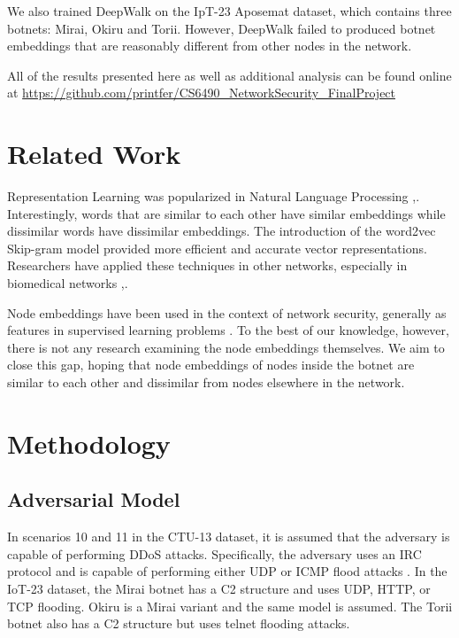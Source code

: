 \documentclass[10pt]{article}
\begin{document}
\begin{multicols}{2}
We also trained DeepWalk on the IpT-23 Aposemat \cite{IoT-23} dataset, which contains three botnets: Mirai, Okiru and Torii. However, DeepWalk failed to produced botnet embeddings that are reasonably different from other nodes in the network.

All of the results presented here as well as additional analysis can be found online at \url{https://github.com/printfer/CS6490_NetworkSecurity_FinalProject}

\section{Related Work}

Representation Learning was popularized in Natural Language Processing \cite{Camacho},\cite{Madelbaum}. Interestingly, words that are similar to each other have similar embeddings while dissimilar words have dissimilar embeddings. The introduction of the word2vec Skip-gram model \cite{Mikolov} provided more efficient and accurate vector representations.  Researchers have applied these techniques in other networks, especially in biomedical networks \cite{Perkins},\cite{Yue}.

Node embeddings have been used in the context of network security, generally as features in supervised learning problems \cite{Skorniakov}. To the best of our knowledge, however, there is not any research examining the node embeddings themselves. We aim to close this gap, hoping that node embeddings of nodes inside the botnet are similar to each other and dissimilar from nodes elsewhere in the network.

\section{Methodology}

\subsection{Adversarial Model}
In scenarios 10 and 11 in the CTU-13 dataset, it is assumed that the adversary is capable of performing DDoS attacks. Specifically, the adversary uses an IRC protocol and is capable of performing either UDP or ICMP flood attacks \cite{Garcia}. In the IoT-23 dataset, the Mirai botnet has a C2 structure and uses UDP, HTTP, or TCP flooding. Okiru is a Mirai variant and the same model is assumed. The Torii botnet also has a C2 structure but uses telnet flooding attacks.


\end{multicols}
\end{document}
